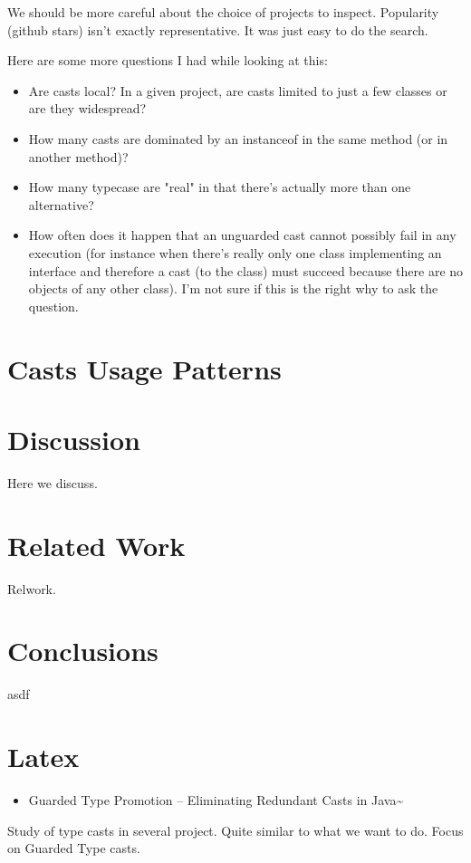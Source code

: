 \documentclass{usiinfdocprop}
\begin{document}
We should be more careful about the choice of projects to inspect. 
Popularity (github stars) isn't exactly representative. 
It was just easy to do the search. 

Here are some more questions I had while looking at this: 
\begin{itemize}
\item Are casts local? In a given project, are casts limited to just a few classes or are they widespread?
\item How many casts are dominated by an instanceof in the same method (or in another method)?
\item How many typecase are "real" in that there's actually more than one alternative?
\item How often does it happen that an unguarded cast cannot possibly fail in any execution (for instance when there's really only one class implementing an interface and therefore a cast (to the class) must succeed because there are no objects of any other class). I'm not sure if this is the right why to ask the question.
\end{itemize}

\section{Casts Usage Patterns \label{org20ce513}}
\label{sec:org97dafed}

\section{Discussion \label{orgd75d6be}}
\label{sec:orge058424}

Here we discuss.

\section{Related Work \label{orgaf6f25f}}
\label{sec:org2b0e76a}

Relwork.


\section{Conclusions \label{org1ebcdd3}}
\label{sec:orga65ac61}
asdf

\section{Latex}
\label{sec:orga60307d}
\begin{itemize}
\item Guarded Type Promotion -- Eliminating Redundant Casts in Java\textasciitilde{}\cite{Winther:2011:GTP:2076674.2076680}
\end{itemize}
Study of type casts in several project. 
Quite similar to what we want to do. 
Focus on Guarded Type casts. 
\end{document}
